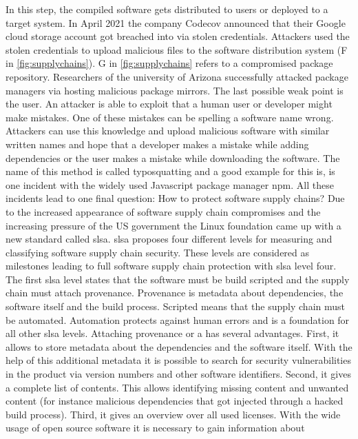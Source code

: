 \documentclass[titlepage]{report}
\begin{document}
In this step, the compiled software gets distributed to users or deployed to a target system. In April 2021 the company Codecov announced that their Google cloud storage account got breached into via stolen credentials\cite{Codecov}\cite{GoogleSecurityBlog}.
Attackers used the stolen credentials to upload malicious files to the software distribution system (F in \autoref{fig:supplychains}). G in \autoref{fig:supplychains} refers to a compromised package repository. Researchers of the university of Arizona
successfully attacked package managers via hosting malicious package mirrors\cite{cappos2008look}\cite{GoogleSecurityBlog}. The last possible weak point is the user. An attacker is able to exploit that a human user or developer might make mistakes.
One of these mistakes can be spelling a software name wrong. Attackers can use this knowledge and upload malicious software with similar written names and hope that a developer makes a mistake while adding dependencies or the user makes a mistake while downloading
the software. The name of this method is called typosquatting and a good example for this is, is one incident with the widely used Javascript package manager npm\cite{Typosquatting}\cite{GoogleSecurityBlog}. All these incidents lead to one final question:
How to protect software supply chains? Due to the increased appearance of software supply chain compromises and the increasing pressure of the US government the Linux foundation came up with a new standard called \gls{slsa}\cite{SLSA}.
\gls{slsa} proposes four different levels for measuring and classifying software supply chain security. These levels are considered as milestones leading to full software supply chain protection with \gls{slsa} level four. The first \gls{slsa} level
states that the software must be build scripted and the supply chain must attach provenance. Provenance is metadata about dependencies, the software itself and the build process\cite{SLSALevels}. Scripted means that the supply chain must be automated.
Automation protects against human errors and is a foundation for all other \gls{slsa} levels. Attaching provenance or a   has several advantages. First, it allows to store metadata about the dependencies and the software itself.
With the help of this additional metadata it is possible to search for security vulnerabilities in the product via version numbers and other software identifiers\cite{pernpeintner2019you}. Second, it gives a complete list of contents. This allows identifying missing content
and unwanted content (for instance malicious dependencies that got injected through a hacked build process). Third, it gives an overview over all used licenses. With the wide usage of open source software it is necessary to gain information about
\end{document}
